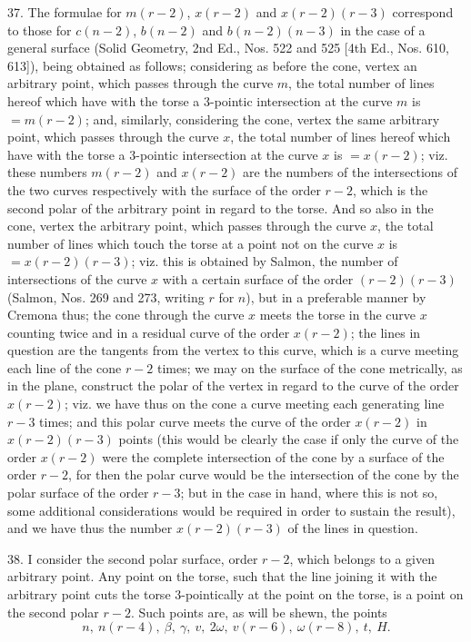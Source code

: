 \documentclass[11pt,a4paper]{article}
\begin{document}
37. The formulae for \(m(r-2)\), \(x(r-2)\) and \(x(r-2)(r-3)\) correspond to those
for \(c(n-2)\), \(b(n-2)\) and \(b(n-2)(n-3)\) in the case of a general surface (Solid
Geometry, 2nd Ed., Nos. 522 and 525 [4th Ed., Nos. 610, 613]), being obtained as
follows; considering as before the cone, vertex an arbitrary point, which passes
through the curve \(m\), the total number of lines hereof which have with the torse a
3-pointic intersection at the curve \(m\) is \(=m(r-2)\); and, similarly, considering
the cone, vertex the same arbitrary point, which passes through the curve \(x\), the
total number of lines hereof which have with the torse a 3-pointic intersection at
the curve \(x\) is \(=x(r-2)\); viz. these numbers \(m(r-2)\) and \(x(r-2)\) are
the numbers of the intersections of the two curves respectively with the surface of
the order \(r-2\), which is the second polar of the arbitrary point in regard to the
torse. And so also in the cone, vertex the arbitrary point, which passes through the
curve \(x\), the total number of lines which touch the torse at a point not on the
curve \(x\) is \(=x(r-2)(r-3)\); viz. this is obtained by Salmon, the number of
intersections of the curve \(x\) with a certain surface of the order \((r-2)(r-3)\)
(Salmon, Nos. 269 and 273, writing \(r\) for \(n\)), but in a preferable manner by
Cremona thus; the cone through the curve \(x\) meets the torse in the curve \(x\)
counting twice and in a residual curve of the order \(x(r-2)\); the lines in question
are the tangents from the vertex to this curve, which is a curve meeting each line of
the cone \(r-2\) times; we may on the surface of the cone metrically, as in the plane,
construct the polar of the vertex in regard to the curve of the order \(x(r-2)\); viz.
we have thus on the cone a curve meeting each generating line \(r-3\) times; and
this polar curve meets the curve of the order \(x(r-2)\) in \(x(r-2)(r-3)\) points
(this would be clearly the case if only the curve of the order \(x(r-2)\) were the
complete intersection of the cone by a surface of the order \(r-2\), for then the polar
curve would be the intersection of the cone by the polar surface of the order \(r-3\);
but in the case in hand, where this is not so, some additional considerations would
be required in order to sustain the result), and we have thus the number
\(x(r-2)(r-3)\) of the lines in question.

38. I consider the second polar surface, order \(r-2\), which belongs to a given
arbitrary point. Any point on the torse, such that the line joining it with the
arbitrary point cuts the torse 3-pointically at the point on the torse, is a point on
the second polar \(r-2\). Such points are, as will be shewn, the points
\[
  n,\ n(r-4),\ \beta,\ \gamma,\ v,\ 2\omega,\ v(r-6),\ \omega(r-8),\ t,\ H.
\]
\end{document}
